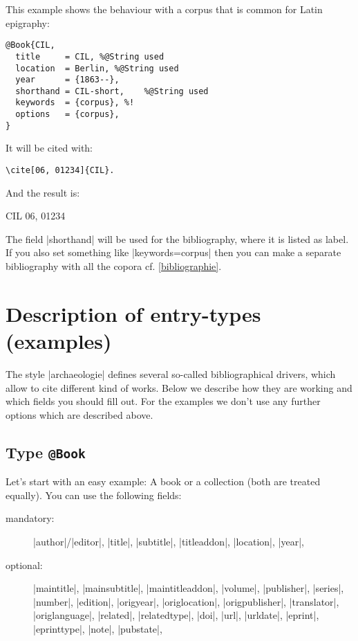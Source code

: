 \documentclass[a4paper,
10pt,
greek,
french,
spanish,
italian,
ngerman,
english
]{ltxdoc}
\begin{document}
This example shows the behaviour with a corpus that is common for Latin epigraphy:
\begin{lstlisting}[style=bibentry,label=CIL,caption={{@}Book\{CIL,…\} }]
@Book{CIL,
  title     = CIL, %@String used
  location  = Berlin, %@String used
  year      = {1863--},
  shorthand = CIL-short,	%@String used
  keywords  = {corpus}, %!
  options   = {corpus},
}
\end{lstlisting}
It will be cited with:
\begin{lstlisting}
\cite[06, 01234]{CIL}.\end{lstlisting}
And the result is:
\begin{bsp}
CIL 06, 01234
\end{bsp}

The field |shorthand| will be used for the bibliography,
where it is listed as label.
If you also set something like  |keywords={corpus}| then you can make a separate bibliography with all the copora cf. \cref{bibliographie}.



 \section{Description of  entry-types (examples)} \label{beispiele}
 The style |archaeologie| defines several so-called bibliographical drivers,
which allow to cite different kind of works.
Below we describe how they are working and which fields you should fill out.
For the examples we don’t use any further options which are described above.


 \subsection{Type \texttt{@Book}}\label{book}
Let’s start with an easy example: A book or a collection (both are treated equally).
You can use the following fields:
\begin{description}
\item[mandatory:] 
|author|/|editor|, 
|title|, |subtitle|, |titleaddon|,
|location|, |year|,
\item[optional:]
|maintitle|, |mainsubtitle|, |maintitleaddon|, |volume|, 
|publisher|, |series|, |number|, |edition|, 
|origyear|, |origlocation|, |origpublisher|, 
|translator|, |origlanguage|,
|related|, |relatedtype|,
|doi|, |url|, |urldate|, |eprint|, |eprinttype|, |note|, |pubstate|, 
 \end{description}
 
\end{document}
